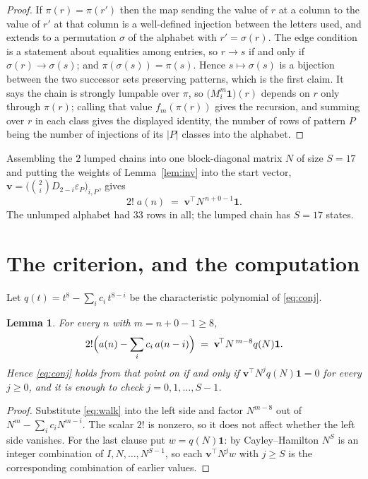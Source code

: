 \documentclass[11pt,a4paper]{article}
\theoremstyle{plain}
\newtheorem{lemma}[theorem]{Lemma}
\theoremstyle{definition}
\begin{document}
\begin{proof}
If $\pi(r)=\pi(r')$ then the map sending the value of $r$ at a column to the value of $r'$
at that column is a well-defined injection between the letters used, and extends to a
permutation $\sigma$ of the alphabet with $r'=\sigma(r)$. The edge condition is a statement
about equalities among entries, so $r\to s$ if and only if $\sigma(r)\to\sigma(s)$; and
$\pi(\sigma(s))=\pi(s)$. Hence $s\mapsto\sigma(s)$ is a bijection between the two successor
sets preserving patterns, which is the first claim. It says the chain is strongly lumpable
over $\pi$, so $\bigl(M_i^{m}\mathbf{1}\bigr)(r)$ depends on $r$ only through $\pi(r)$;
calling that value $f_m(\pi(r))$ gives the recursion, and summing over $r$ in each class
gives the displayed identity, the number of rows of pattern $P$ being the number of
injections of its $|P|$ classes into the alphabet.
\end{proof}

Assembling the $2$ lumped chains into one block-diagonal matrix $N$ of size $S=17$ and
putting the weights of Lemma~\ref{lem:inv} into the start vector,
$\mathbf{v}=\bigl(\binom{2}{i}D_{2-i}\varepsilon_P\bigr)_{i,P}$, gives
\begin{equation}\label{eq:walk}
2!\;a(n)\;=\;\mathbf{v}^{\!\top}N^{\,n+0-1}\mathbf{1} .
\end{equation}
The unlumped alphabet had $33$ rows in all; the lumped chain has $S=17$ states.

\section{The criterion, and the computation}

Let $q(t)=t^{8}-\sum_i c_i\,t^{8-i}$ be the characteristic polynomial of
\eqref{eq:conj}.

\begin{lemma}\label{lem:crit}
For every $n$ with $m=n+0-1\ge8$,
\[
2!\Bigl(a(n)-\sum_i c_i\,a(n-i)\Bigr)\;=\;\mathbf{v}^{\!\top}N^{\,m-8}q(N)\mathbf{1} .
\]
Hence \eqref{eq:conj} holds from that point on if and only if
$\mathbf{v}^{\!\top}N^{j}q(N)\mathbf{1}=0$ for every $j\ge0$, and it is enough to check
$j=0,1,\dots,S-1$.
\end{lemma}

\begin{proof}
Substitute \eqref{eq:walk} into the left side and factor $N^{m-8}$ out of
$N^{m}-\sum_i c_iN^{m-i}$. The scalar $2!$ is nonzero, so it does not affect whether
the left side vanishes. For the last clause put $w=q(N)\mathbf{1}$: by Cayley--Hamilton
$N^{S}$ is an integer combination of $I,N,\dots,N^{S-1}$, so each
$\mathbf{v}^{\!\top}N^{j}w$ with $j\ge S$ is the corresponding combination of earlier
values.
\end{proof}
\end{document}

